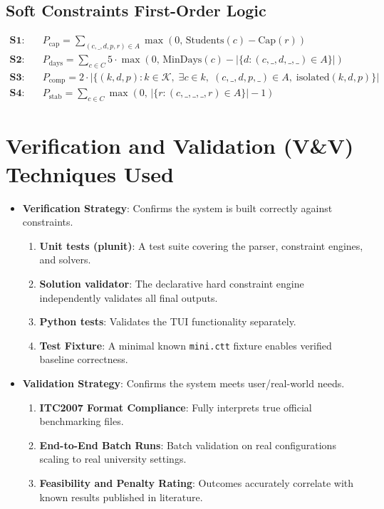 \documentclass[11pt,letterpaper]{article}
\begin{document}
\subsection{Soft Constraints First-Order Logic}
\begin{align*}
\textbf{S1}:\quad & P_{\text{cap}} = \sum_{(c,\_,d,p,r)\in A} \max(0,\, \text{Students}(c) - \text{Cap}(r)) \\
\textbf{S2}:\quad & P_{\text{days}} = \sum_{c \in C} 5 \cdot \max(0,\, \text{MinDays}(c) - |\{d : (c,\_,d,\_,\_)\in A\}|) \\
\textbf{S3}:\quad & P_{\text{comp}} = 2 \cdot |\{(k,d,p) : k\in\mathcal{K},\; \exists c\in k,\; (c,\_,d,p,\_)\in A,\; \text{isolated}(k,d,p)\}| \\
\textbf{S4}:\quad & P_{\text{stab}} = \sum_{c\in C} \max(0,\, |\{r : (c,\_,\_,\_,r)\in A\}| - 1)
\end{align*}

\section{Verification and Validation (V\&V) Techniques Used}
\begin{itemize}
\item \textbf{Verification Strategy}: Confirms the system is built correctly against constraints.
\begin{enumerate}[nosep]
  \item \textbf{Unit tests (plunit)}: A test suite covering the parser, constraint engines, and solvers.
  \item \textbf{Solution validator}: The declarative hard constraint engine independently validates all final outputs.
  \item \textbf{Python tests}: Validates the TUI functionality separately.
  \item \textbf{Test Fixture}: A minimal known \texttt{mini.ctt} fixture enables verified baseline correctness.
\end{enumerate}

\item \textbf{Validation Strategy}: Confirms the system meets user/real-world needs.
\begin{enumerate}[nosep]
  \item \textbf{ITC2007 Format Compliance}: Fully interprets true official benchmarking files.
  \item \textbf{End-to-End Batch Runs}: Batch validation on real configurations scaling to real university settings.
  \item \textbf{Feasibility and Penalty Rating}: Outcomes accurately correlate with known results published in literature.
\end{enumerate}
\end{itemize}
\end{document}
